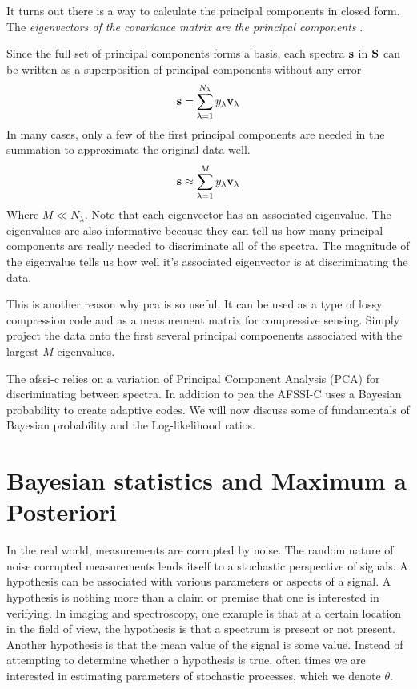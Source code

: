 It turns out there is a way to calculate the principal components in closed form. The \emph{eigenvectors of the covariance matrix are the principal components} \cite{shlens2014tutorial}. 

Since the full set of principal components forms a basis, each spectra $\mathbf{s}$ in $\mathbf{S}$ can be written as a superposition of principal components without any error
\begin{equation}
\mathbf{s} = \sum_{\lambda = 1}^{N_{\lambda}} y_{\lambda} \mathbf{v}_{\lambda}
\end{equation}
In many cases, only a few of the first principal components are needed in the summation to approximate the original data well.
\begin{equation}
{\mathbf{s}} \approx \sum_{\lambda = 1}^{M} y_{\lambda} \mathbf{v}_{\lambda}
\end{equation}
Where $M \ll N_{\lambda} $. Note that each eigenvector has an associated eigenvalue. The eigenvalues are also informative because they can tell us how many principal components are really needed to discriminate all of the spectra. The magnitude of the eigenvalue tells us how well it's associated eigenvector is at discriminating the data.

This is another reason why \gls{pca} is so useful. It can be used as a type of lossy compression code and as a measurement matrix for compressive sensing. Simply project the data onto the first several principal compoenents associated with the largest $M$ eigenvalues. 

The \gls{afssi-c} relies on a variation of Principal Component Analysis (PCA) for discriminating between spectra. In addition to \gls{pca} the AFSSI-C uses a Bayesian probability to create adaptive codes. We will now discuss some of fundamentals of Bayesian probability and the Log-likelihood ratios. 

\section{Bayesian statistics and Maximum a Posteriori}

In the real world, measurements are corrupted by noise. The random nature of noise corrupted measurements lends itself to a stochastic perspective of signals. A hypothesis can be associated with various parameters or aspects of a signal. A hypothesis is nothing more than a claim or premise that one is interested in verifying. In imaging and spectroscopy, one example is that at a certain location in the field of view, the hypothesis is that a spectrum is present or not present. Another hypothesis is that the mean value of the signal is some value. Instead of attempting to determine whether a hypothesis is true, often times we are interested in estimating parameters of stochastic processes, which we denote $\theta$.

